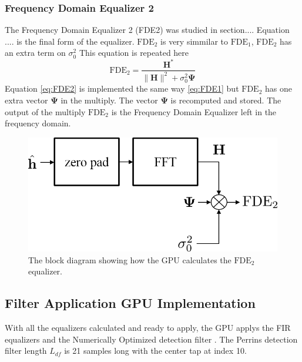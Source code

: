 \subsubsection{Frequency Domain Equalizer 2}
The Frequency Domain Equalizer 2 (FDE2) was studied in section....
Equation .... is the final form of the equalizer.
$\text{FDE}_2$ is very simmilar to $\text{FDE}_1$, $\text{FDE}_2$ has an extra term on $\sigma_0^2$
This equation is repeated here
\begin{equation}
\text{FDE}_2 = \frac{\mathbf{H}^*}{\|\mathbf{H}\|^2 + \sigma_0^2 \mathbf{\Psi}}
\label{eq:FDE2}
\end{equation}
Equation \eqref{eq:FDE2} is implemented the same way \eqref{eq:FDE1} but $\text{FDE}_2$ has one extra vector $\mathbf{\Psi}$ in the multiply.
The vector $\mathbf{\Psi}$ is recomputed and stored.
The output of the multiply $\text{FDE}_2$ is the Frequency Domain Equalizer left in the  frequency domain.
\begin{figure}
	\centering\includegraphics[width=\textwidth/10*5]{figures/gpu/FDE2_block.png}
	\caption{The block diagram showing how the GPU calculates the $\text{FDE}_2$ equalizer.}
	\label{fig:FDE2_block}
\end{figure}

\subsection{Filter Application GPU Implementation}
With all the equalizers calculated and ready to apply, the GPU applys the FIR equalizers and the Numerically Optimized detection filter \cite{NO_perrins}.
The Perrins detection filter length $L_{df}$ is 21 samples long with the center tap at index 10.


